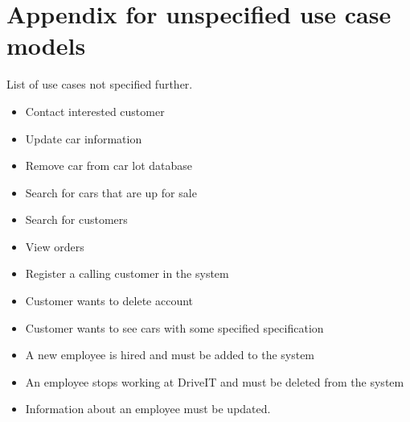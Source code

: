 \section{Appendix for unspecified use case models}
\label{sec:unspecified_use_case_models}

List of use cases not specified further.
\begin{itemize}
    \item Contact interested customer
    \item Update car information
    \item Remove car from car lot database
    \item Search for cars that are up for sale
    \item Search for customers
    \item View orders
    \item Register a calling customer in the system
    \item Customer wants to delete account
    \item Customer wants to see cars with some specified specification
    \item A new employee is hired and must be added to the system
    \item An employee stops working at DriveIT and must be deleted from the system
    \item Information about an employee must be updated.
\end{itemize}

